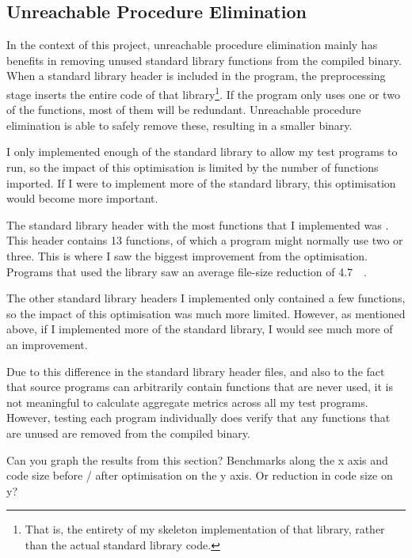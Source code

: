 \documentclass[00-main.tex]{subfiles}
\begin{document}
\subsection{Unreachable Procedure Elimination}

In the context of this project, unreachable procedure elimination mainly has benefits in removing unused standard library functions from the compiled binary.
When a standard library header is included in the program, the preprocessing stage inserts the entire code of that library\footnote{That is, the entirety of my skeleton implementation of that library, rather than the actual standard library code.}.
If the program only uses one or two of the functions, most of them will be redundant.
Unreachable procedure elimination is able to safely remove these, resulting in a smaller binary.

I only implemented enough of the standard library to allow my test programs to run, so the impact of this optimisation is limited by the number of functions imported.
If I were to implement more of the standard library, this optimisation would become more important.

The standard library header with the most functions that I implemented was .
This header contains 13 functions, of which a program might normally use two or three.
This is where I saw the biggest improvement from the optimisation.
Programs that used the  library saw an average file-size reduction of \SI{4.7}{\kilo\byte}.

The other standard library headers I implemented only contained a few functions, so the impact of this optimisation was much more limited. However, as mentioned above, if I implemented more of the standard library, I would see much more of an improvement.

Due to this difference in the standard library header files, and also to the fact that source programs can arbitrarily contain functions that are never used, it is not meaningful to calculate aggregate metrics across all my test programs.
However, testing each program individually does verify that any functions that are unused are removed from the compiled binary.

\begin{mrwComment}
Can you graph the results from this section?  Benchmarks along the x
axis and code size before / after optimisation on the y axis.  Or
reduction in code size on y?
\end{mrwComment}
\end{document}
